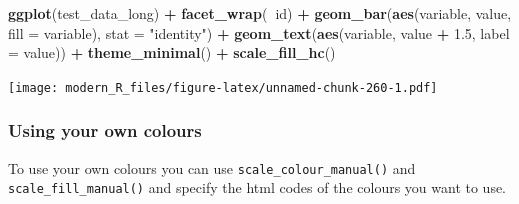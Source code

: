 \documentclass[]{gitbook}
\newenvironment{Shaded}{\begin{snugshade}}{\end{snugshade}}
\newcommand{\DataTypeTok}[1]{\textcolor[rgb]{0.13,0.29,0.53}{#1}}
\newcommand{\FloatTok}[1]{\textcolor[rgb]{0.00,0.00,0.81}{#1}}
\newcommand{\KeywordTok}[1]{\textcolor[rgb]{0.13,0.29,0.53}{\textbf{#1}}}
\newcommand{\NormalTok}[1]{#1}
\newcommand{\OperatorTok}[1]{\textcolor[rgb]{0.81,0.36,0.00}{\textbf{#1}}}
\newcommand{\StringTok}[1]{\textcolor[rgb]{0.31,0.60,0.02}{#1}}
\theoremstyle{definition}
\theoremstyle{definition}
\theoremstyle{definition}
\theoremstyle{remark}
\begin{document}
\begin{Shaded}
\begin{Highlighting}[]
\KeywordTok{ggplot}\NormalTok{(test_data_long) }\OperatorTok{+}
\StringTok{  }\KeywordTok{facet_wrap}\NormalTok{(}\OperatorTok{~}\NormalTok{id) }\OperatorTok{+}
\StringTok{  }\KeywordTok{geom_bar}\NormalTok{(}\KeywordTok{aes}\NormalTok{(variable, value, }\DataTypeTok{fill =}\NormalTok{ variable), }\DataTypeTok{stat =} \StringTok{"identity"}\NormalTok{) }\OperatorTok{+}
\StringTok{  }\KeywordTok{geom_text}\NormalTok{(}\KeywordTok{aes}\NormalTok{(variable, value }\OperatorTok{+}\StringTok{ }\FloatTok{1.5}\NormalTok{, }\DataTypeTok{label =}\NormalTok{ value)) }\OperatorTok{+}
\StringTok{  }\KeywordTok{theme_minimal}\NormalTok{() }\OperatorTok{+}
\StringTok{  }\KeywordTok{scale_fill_hc}\NormalTok{()}
\end{Highlighting}
\end{Shaded}

\texttt{[image: modern\_R\_files/figure-latex/unnamed-chunk-260-1.pdf]}

\hypertarget{using-your-own-colours}{%
\subsubsection{Using your own colours}\label{using-your-own-colours}}

To use your own colours you can use \texttt{scale\_colour\_manual()} and
\texttt{scale\_fill\_manual()} and specify the html codes of the colours
you want to use.

\begin{Shaded}
\end{Shaded}
\end{document}

